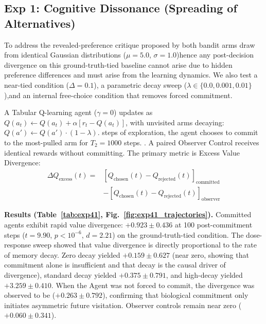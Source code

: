 \documentclass[conference]{IEEEtran}
\begin{document}
\subsection{Exp 1: Cognitive Dissonance (Spreading of Alternatives)}

To address the revealed-preference critique proposed by \citet{chen2010choice} both bandit arms draw from identical Gaussian distributions ($\mu=5.0$, $\sigma=1.0$)hence any post-decision divergence on this ground-truth-tied baseline cannot arise due to hidden preference differences and must arise from the learning dynamics. We also test a near-tied condition ($\Delta=0.1$), a parametric decay sweep ($\lambda\in\{0.0, 0.001, 0.01\}$),and an internal free-choice condition that removes forced commitment.

A Tabular Q-learning agent ($\gamma=0$) updates as $Q(a_t)\leftarrow Q(a_t)+\alpha[r_t-Q(a_t)]$, with unvisited arms decaying: $Q(a')\leftarrow Q(a')\cdot(1-\lambda)$. steps of exploration, the agent chooses to commit to the most-pulled arm for $T_2=1000$ steps. . A paired Observer Control receives identical rewards without committing. The primary metric is Excess Value Divergence:
\begin{equation}
    \begin{split}
        \Delta Q_{\text{excess}}(t) ={}& [Q_{\text{chosen}}(t)-Q_{\text{rejected}}(t)]_{\text{committed}} \\
        &- [Q_{\text{chosen}}(t)-Q_{\text{rejected}}(t)]_{\text{observer}}
    \end{split}
\end{equation}

\textbf{Results (Table~\ref{tab:exp41}, Fig.~\ref{fig:exp41_trajectories}).} Committed agents exhibit rapid value divergence: $+0.923\pm0.436$ at 100 post-commitment steps ($t=9.90$, $p<10^{-6}$, $d=2.21$) on the ground-truth-tied condition. The dose-response sweep showed that value divergence is directly proportional to the rate of memory decay. Zero decay yielded $+0.159\pm0.627$ (near zero, showing that commitment alone is insufficient and that decay is the causal driver of divergence), standard decay yielded $+0.375\pm0.791$, and high-decay yielded $+3.259\pm0.410$. When the Agent was not forced to commit, the divergence was observed to be ($+0.263\pm0.792$), confirming that biological commitment only initiates asymmetric future visitation. Observer controls remain near zero ($+0.060\pm0.341$).
\end{document}
